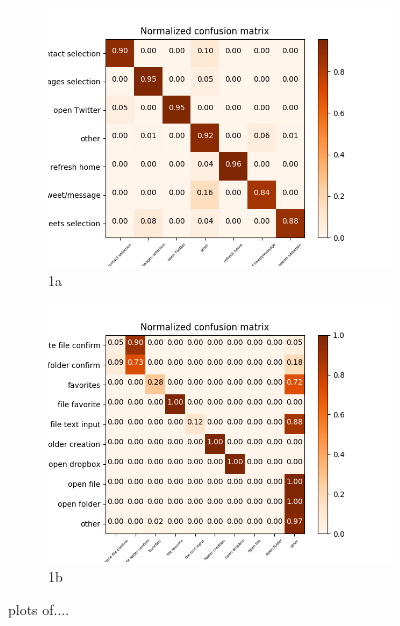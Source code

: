 \begin{figure}[h]
\begin{subfigure}{.5\textwidth}
  \centering
  \includegraphics[scale=0.45]{images/best}
  \caption{1a}
  \label{fig:sfig1}
\end{subfigure}%
\begin{subfigure}{.5\textwidth}
  \centering
  \includegraphics[scale=0.45]{images/worst}
  \caption{1b}
  \label{fig:sfig2}
\end{subfigure}
\caption{plots of....}
\label{fig:fig}
\end{figure}




